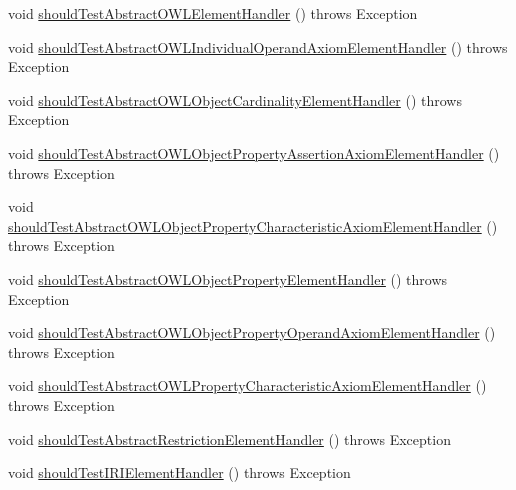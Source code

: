 \begin{DoxyCompactItemize}
\item 
void \hyperlink{classorg_1_1semanticweb_1_1owlapi_1_1contract_1_1_contract_owlxmlparser_test_af710204af629bdbff75532e4c9f08184}{should\-Test\-Abstract\-O\-W\-L\-Element\-Handler} ()  throws Exception 
\item 
void \hyperlink{classorg_1_1semanticweb_1_1owlapi_1_1contract_1_1_contract_owlxmlparser_test_afb7d5f90bc5f8c85b6972d6d92921f4e}{should\-Test\-Abstract\-O\-W\-L\-Individual\-Operand\-Axiom\-Element\-Handler} ()  throws Exception 
\item 
void \hyperlink{classorg_1_1semanticweb_1_1owlapi_1_1contract_1_1_contract_owlxmlparser_test_ae7d6bdf3b884a28d8b2fc64be5dc41e1}{should\-Test\-Abstract\-O\-W\-L\-Object\-Cardinality\-Element\-Handler} ()  throws Exception 
\item 
void \hyperlink{classorg_1_1semanticweb_1_1owlapi_1_1contract_1_1_contract_owlxmlparser_test_aae2765ea6416f8a564e87e213f613a44}{should\-Test\-Abstract\-O\-W\-L\-Object\-Property\-Assertion\-Axiom\-Element\-Handler} ()  throws Exception 
\item 
void \hyperlink{classorg_1_1semanticweb_1_1owlapi_1_1contract_1_1_contract_owlxmlparser_test_a593b81eb96581b0f4c8bfb0d59e694b1}{should\-Test\-Abstract\-O\-W\-L\-Object\-Property\-Characteristic\-Axiom\-Element\-Handler} ()  throws Exception 
\item 
void \hyperlink{classorg_1_1semanticweb_1_1owlapi_1_1contract_1_1_contract_owlxmlparser_test_aeca5f5df8703824ac05feb46396e5c30}{should\-Test\-Abstract\-O\-W\-L\-Object\-Property\-Element\-Handler} ()  throws Exception 
\item 
void \hyperlink{classorg_1_1semanticweb_1_1owlapi_1_1contract_1_1_contract_owlxmlparser_test_aa2fcf687e0f20f5170581c289212a2c2}{should\-Test\-Abstract\-O\-W\-L\-Object\-Property\-Operand\-Axiom\-Element\-Handler} ()  throws Exception 
\item 
void \hyperlink{classorg_1_1semanticweb_1_1owlapi_1_1contract_1_1_contract_owlxmlparser_test_af0d320c80fd98ca61899a10d083d83ab}{should\-Test\-Abstract\-O\-W\-L\-Property\-Characteristic\-Axiom\-Element\-Handler} ()  throws Exception 
\item 
void \hyperlink{classorg_1_1semanticweb_1_1owlapi_1_1contract_1_1_contract_owlxmlparser_test_aa43f941985dbe42a6ca96b65bd4d625c}{should\-Test\-Abstract\-Restriction\-Element\-Handler} ()  throws Exception 
\item 
void \hyperlink{classorg_1_1semanticweb_1_1owlapi_1_1contract_1_1_contract_owlxmlparser_test_a96230705ae5c0caabc926814c97404b3}{should\-Test\-I\-R\-I\-Element\-Handler} ()  throws Exception 

\end{DoxyCompactItemize}
